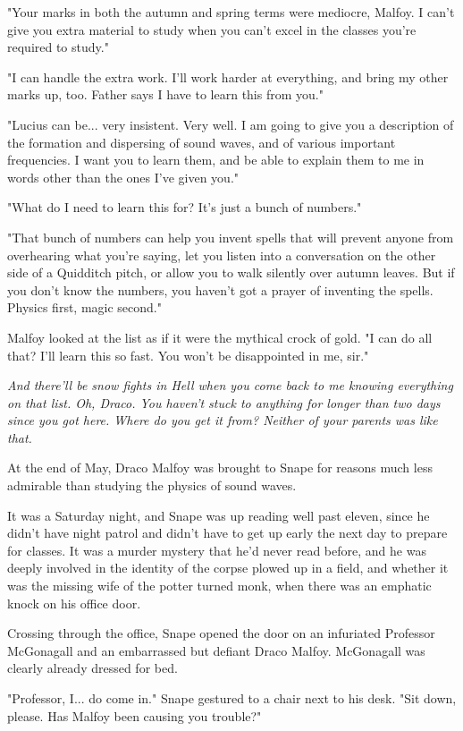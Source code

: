 \documentclass[a4paper,11pt]{article}
\begin{document}
"Your marks in both the autumn and spring terms were mediocre, Malfoy. I can't give you extra material to study when you can't excel in the classes you're required to study."

"I can handle the extra work. I'll work harder at everything, and bring my other marks up, too. Father says I have to learn this from you."

"Lucius can be... very insistent. Very well. I am going to give you a description of the formation and dispersing of sound waves, and of various important frequencies. I want you to learn them, and be able to explain them to me in words other than the ones I've given you."

"What do I need to learn this for? It's just a bunch of numbers."

"That bunch of numbers can help you invent spells that will prevent anyone from overhearing what you're saying, let you listen into a conversation on the other side of a Quidditch pitch, or allow you to walk silently over autumn leaves. But if you don't know the numbers, you haven't got a prayer of inventing the spells. Physics first, magic second."

Malfoy looked at the list as if it were the mythical crock of gold. "I can do all that? I'll learn this so fast. You won't be disappointed in me, sir."

\emph{And there'll be snow fights in Hell when you come back to me knowing everything on that list. Oh, Draco. You haven't stuck to anything for longer than two days since you got here. Where do you get it from? Neither of your parents was like that.}

At the end of May, Draco Malfoy was brought to Snape for reasons much less admirable than studying the physics of sound waves.

It was a Saturday night, and Snape was up reading well past eleven, since he didn't have night patrol and didn't have to get up early the next day to prepare for classes. It was a murder mystery that he'd never read before, and he was deeply involved in the identity of the corpse plowed up in a field, and whether it was the missing wife of the potter turned monk, when there was an emphatic knock on his office door.

Crossing through the office, Snape opened the door on an infuriated Professor McGonagall and an embarrassed but defiant Draco Malfoy. McGonagall was clearly already dressed for bed.

"Professor, I... do come in." Snape gestured to a chair next to his desk. "Sit down, please. Has Malfoy been causing you trouble?"
\end{document}

